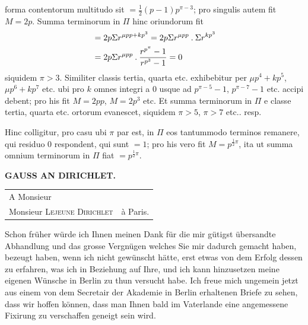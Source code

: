 forma contentorum multitudo sit $=\frac12(p-1)p^{\pi-3}$; pro singulis autem fit $M=2p$. Summa terminorum in $\Pi$ hinc oriundorum fit
\[
\begin{aligned}
&=2p\Sigma r^{\mu pp+kp^3}=2p\Sigma r^{\mu pp}\mathbin{.}\Sigma r^{kp^3}\\
&=2p\Sigma r^{\mu pp}\mathbin{.}\frac{r^{p^\pi}-1}{r^{p^3}-1}=0
\end{aligned}
\]
siquidem $\pi>3$. Similiter classis tertia, quarta etc. exhibebitur per $\mu p^4+kp^5$, $\mu p^6+kp^7$ etc. ubi pro $k$ omnes integri a $0$ usque ad $p^{\pi-5}-1$, $p^{\pi-7}-1$ etc. accipi debent; pro his fit $M=2pp$, $M=2p^3$ etc. Et summa terminorum in $\Pi$ e classe tertia, quarta etc. ortorum evanescet, siquidem $\pi>5$, $\pi>7$ etc.. resp.
\par Hinc colligitur, pro casu ubi $\pi$ par est, in $\Pi$ eos tantummodo terminos remanere, qui residuo $0$ respondent, qui sunt $=1$; pro his vero fit $M=p^{\frac12\pi}$, ita ut summa omnium terminorum in $\Pi$ fiat $=p^{\frac12\pi}$.
\clearpage\renewcommand{\BookRunningTitle}{Gauss an Dirichlet.}
\begingroup\fontsize{10.5}{12}\selectfont
{}
\begin{center}\textbf{GAUSS AN DIRICHLET.}\end{center}
\begin{center}
\begin{tabular}{ll}
\hline
A Monsieur&\\
\quad Monsieur \textsc{Lejeune Dirichlet}&\quad à Paris.\\
\hline
\end{tabular}
\end{center}
Schon früher würde ich Ihnen meinen Dank für die mir gütigst übersandte Abhandlung und das grosse Vergnügen welches Sie mir dadurch gemacht haben, bezeugt haben, wenn ich nicht gewünscht hätte, erst etwas von dem Erfolg dessen zu erfahren, was ich in Beziehung auf Ihre, und ich kann hinzusetzen meine eigenen Wünsche in Berlin zu thun versucht habe. Ich freue mich ungemein jetzt aus einem von dem Secretair der Akademie in Berlin erhaltenen Briefe zu sehen, dass wir hoffen können, dass man Ihnen bald im Vaterlande eine angemessene Fixirung zu verschaffen geneigt sein wird.
